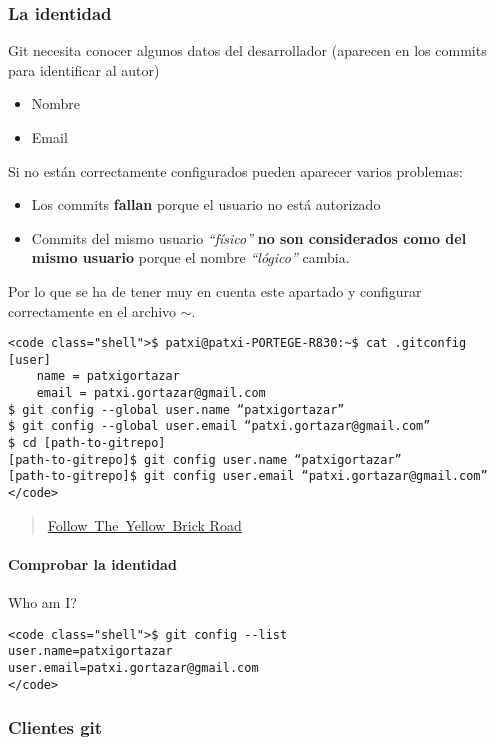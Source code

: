 \subsubsection{La identidad}

Git necesita conocer algunos datos del desarrollador (aparecen en los
commits para identificar al autor)

\begin{itemize}
\item
  Nombre
\item
  Email
\end{itemize}
Si no están correctamente configurados pueden aparecer varios problemas:

\begin{itemize}
\item
  Los commits \textbf{fallan} porque el usuario no está autorizado
\item
  Commits del mismo usuario \emph{``físico''} \textbf{no son
  considerados como del mismo usuario} porque el nombre
  \emph{``lógico''} cambia.
\end{itemize}
Por lo que se ha de tener muy en cuenta este apartado y configurar
correctamente en el archivo \texttt{\ensuremath{\sim}}.

\begin{verbatim}
<code class="shell">$ patxi@patxi-PORTEGE-R830:~$ cat .gitconfig 
[user]
    name = patxigortazar
    email = patxi.gortazar@gmail.com
$ git config --global user.name “patxigortazar”
$ git config --global user.email “patxi.gortazar@gmail.com”
$ cd [path-to-gitrepo]
[path-to-gitrepo]$ git config user.name “patxigortazar”
[path-to-gitrepo]$ git config user.email “patxi.gortazar@gmail.com”
</code>
\end{verbatim}
\begin{quote}
\href{http://git-scm.com/book/en/Customizing-Git-Git-Configuration}{Follow~The~Yellow~Brick
Road}

\end{quote}
\paragraph{Comprobar la identidad}

Who am I?

\begin{verbatim}
<code class="shell">$ git config --list
user.name=patxigortazar
user.email=patxi.gortazar@gmail.com
</code>
\end{verbatim}
\subsubsection{Clientes git}

